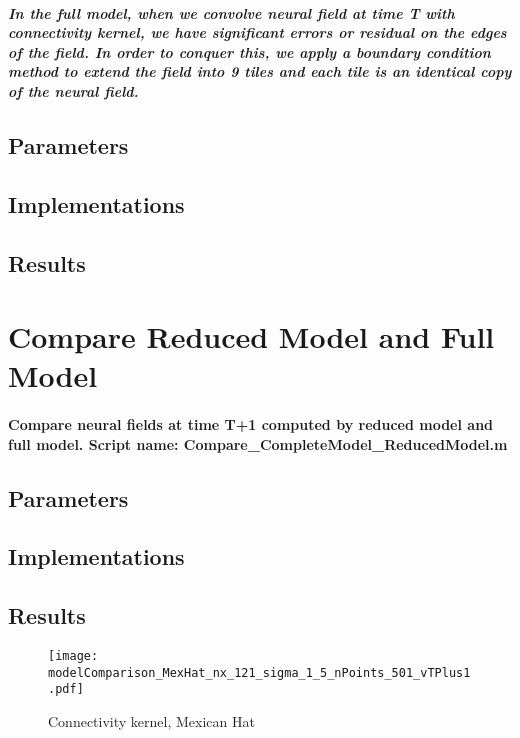 \documentclass[a4paper, 12pt, english]{article}
\begin{document}
\subparagraph{In the full model, when we convolve neural field at time T with connectivity kernel,
we have significant errors or residual on the edges of the field. In order to conquer this,
we apply a boundary condition method to extend the field into 9 tiles and each tile is an identical copy
of the neural field.}

\subsection{Parameters}
\subsection{Implementations}
\subsection{Results}
\newpage


\section{Compare Reduced Model and Full Model}
\paragraph{Compare neural fields at time T+1 computed by reduced model and full model.\newline
Script name: Compare\_CompleteModel\_ReducedModel.m}
\subsection{Parameters}
\subsection{Implementations}
\subsection{Results}


\begin{figure}[H]
\centering
\texttt{[image: modelComparison\_MexHat\_nx\_121\_sigma\_1\_5\_nPoints\_501\_vTPlus1.pdf]}
\caption{Connectivity kernel, Mexican Hat}
\end{figure}
\end{document}

